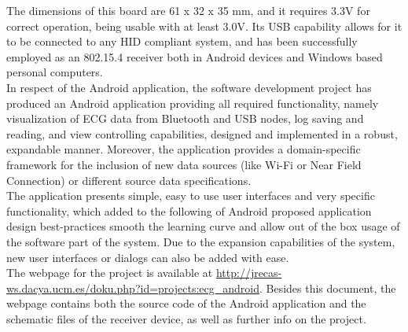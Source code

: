 		The dimensions of this board are 61 x 32 x 35 mm, and it requires 3.3V for correct operation, being usable with at least 3.0V. Its USB capability allows for it to be connected to any HID compliant system, and has been successfully employed as an 802.15.4 receiver both in Android devices and Windows based personal computers.\\

		In respect of the Android application, the software development project has produced an Android application providing all required functionality, namely visualization of ECG data from Bluetooth and USB nodes, log saving and reading, and view controlling capabilities, designed and implemented in a robust, expandable manner. Moreover, the application provides a domain-specific framework for the inclusion of new data sources (like Wi-Fi or Near Field Connection) or different source data specifications.\\

		The application presents simple, easy to use user interfaces and very specific functionality, which added to the following of Android proposed application design best-practices smooth the learning curve and allow out of the box usage of the software part of the system. Due to the expansion capabilities of the system, new user interfaces or dialogs can also be added with ease.\\

		The webpage for the project is available at		
		\url{http://jrecas-ws.dacya.ucm.es/doku.php?id=projects:ecg_android}.
		Besides this document, the webpage contains both the source code of the Android application and the schematic files of the receiver device, as well as further info on the project.
	
